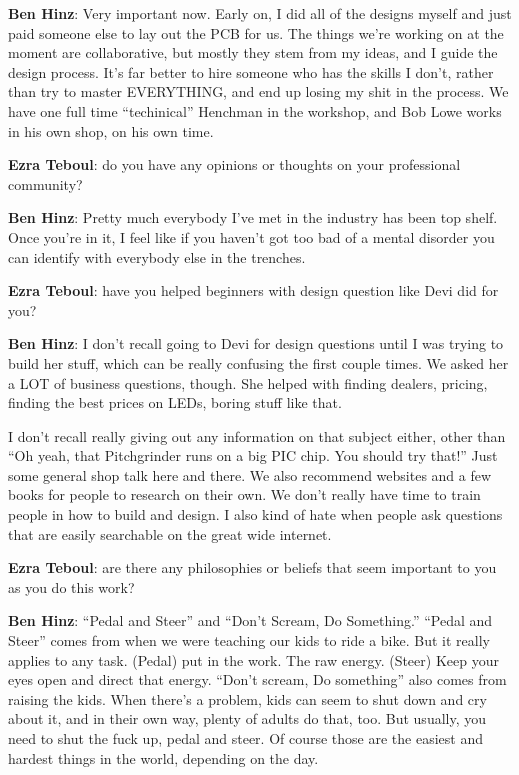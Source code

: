 \textbf{Ben Hinz}: Very important now. Early on, I did all of the designs myself and just paid someone else to lay out the PCB for us. The things we're working on at the moment are collaborative, but mostly they stem from my ideas, and I guide the design process. It's far better to hire someone who has the skills I don't, rather than try to master EVERYTHING, and end up losing my shit in the process. We have one full time ``techinical'' Henchman in the workshop, and Bob Lowe works in his own shop, on his own time. 

\textbf{Ezra Teboul}: do you have any opinions or thoughts on your professional community? 

\textbf{Ben Hinz}: Pretty much everybody I've met in the industry has been top shelf. Once you're in it, I feel like if you haven't got too bad of a mental disorder you can identify with everybody else in the trenches. 

\textbf{Ezra Teboul}: have you helped beginners with design question like Devi did for you? 

\textbf{Ben Hinz}: I don't recall going to Devi for design questions until I was trying to build her stuff, which can be really confusing the first couple times. We asked her a LOT of business questions, though.  She helped with finding dealers, pricing, finding the best prices on LEDs, boring stuff like that. 

I don't recall really giving out any information on that subject either, other than ``Oh yeah, that Pitchgrinder runs on a big PIC chip. You should try that!'' Just some general shop talk here and there. We also recommend websites and a few books for people to research on their own. We don’t really have time to train people in how to build and design. I also kind of hate when people ask questions that are easily searchable on the great wide internet.

\textbf{Ezra Teboul}: are there any philosophies or beliefs that seem important to you as you do this work?

\textbf{Ben Hinz}: ``Pedal and Steer'' and ``Don't Scream, Do Something.'' ``Pedal and Steer'' comes from when we were teaching our kids to ride a bike. But it really applies to any task. (Pedal) put in the work. The raw energy. (Steer) Keep your eyes open and direct that energy. ``Don't scream, Do something'' also comes from raising the kids. When there's a problem, kids can seem to shut down and cry about it, and in their own way, plenty of adults do that, too. But usually, you need to shut the fuck up, pedal and steer. Of course those are the easiest and hardest things in the world, depending on the day.

